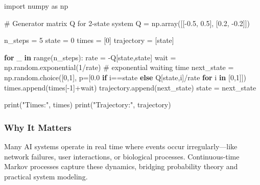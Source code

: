 \documentclass[
  letterpaper,
  DIV=11,
  numbers=noendperiod]{scrreprt}
\newenvironment{Shaded}{\begin{snugshade}}{\end{snugshade}}
\newcommand{\BuiltInTok}[1]{\textcolor[rgb]{0.00,0.23,0.31}{#1}}
\newcommand{\CommentTok}[1]{\textcolor[rgb]{0.37,0.37,0.37}{#1}}
\newcommand{\ControlFlowTok}[1]{\textcolor[rgb]{0.00,0.23,0.31}{\textbf{#1}}}
\newcommand{\DecValTok}[1]{\textcolor[rgb]{0.68,0.00,0.00}{#1}}
\newcommand{\FloatTok}[1]{\textcolor[rgb]{0.68,0.00,0.00}{#1}}
\newcommand{\ImportTok}[1]{\textcolor[rgb]{0.00,0.46,0.62}{#1}}
\newcommand{\KeywordTok}[1]{\textcolor[rgb]{0.00,0.23,0.31}{\textbf{#1}}}
\newcommand{\NormalTok}[1]{\textcolor[rgb]{0.00,0.23,0.31}{#1}}
\newcommand{\OperatorTok}[1]{\textcolor[rgb]{0.37,0.37,0.37}{#1}}
\newcommand{\StringTok}[1]{\textcolor[rgb]{0.13,0.47,0.30}{#1}}
\begin{document}
\begin{Shaded}
\begin{Highlighting}[]
\ImportTok{import}\NormalTok{ numpy }\ImportTok{as}\NormalTok{ np}

\CommentTok{\# Generator matrix Q for 2{-}state system}
\NormalTok{Q }\OperatorTok{=}\NormalTok{ np.array([[}\OperatorTok{{-}}\FloatTok{0.5}\NormalTok{, }\FloatTok{0.5}\NormalTok{],}
\NormalTok{              [}\FloatTok{0.2}\NormalTok{, }\OperatorTok{{-}}\FloatTok{0.2}\NormalTok{]])}

\NormalTok{n\_steps }\OperatorTok{=} \DecValTok{5}
\NormalTok{state }\OperatorTok{=} \DecValTok{0}
\NormalTok{times }\OperatorTok{=}\NormalTok{ [}\DecValTok{0}\NormalTok{]}
\NormalTok{trajectory }\OperatorTok{=}\NormalTok{ [state]}

\ControlFlowTok{for}\NormalTok{ \_ }\KeywordTok{in} \BuiltInTok{range}\NormalTok{(n\_steps):}
\NormalTok{    rate }\OperatorTok{=} \OperatorTok{{-}}\NormalTok{Q[state,state]}
\NormalTok{    wait }\OperatorTok{=}\NormalTok{ np.random.exponential(}\DecValTok{1}\OperatorTok{/}\NormalTok{rate)  }\CommentTok{\# exponential waiting time}
\NormalTok{    next\_state }\OperatorTok{=}\NormalTok{ np.random.choice([}\DecValTok{0}\NormalTok{,}\DecValTok{1}\NormalTok{], p}\OperatorTok{=}\NormalTok{[}\FloatTok{0.0} \ControlFlowTok{if}\NormalTok{ i}\OperatorTok{==}\NormalTok{state }\ControlFlowTok{else}\NormalTok{ Q[state,i]}\OperatorTok{/}\NormalTok{rate }\ControlFlowTok{for}\NormalTok{ i }\KeywordTok{in}\NormalTok{ [}\DecValTok{0}\NormalTok{,}\DecValTok{1}\NormalTok{]])}
\NormalTok{    times.append(times[}\OperatorTok{{-}}\DecValTok{1}\NormalTok{]}\OperatorTok{+}\NormalTok{wait)}
\NormalTok{    trajectory.append(next\_state)}
\NormalTok{    state }\OperatorTok{=}\NormalTok{ next\_state}

\BuiltInTok{print}\NormalTok{(}\StringTok{"Times:"}\NormalTok{, times)}
\BuiltInTok{print}\NormalTok{(}\StringTok{"Trajectory:"}\NormalTok{, trajectory)}
\end{Highlighting}
\end{Shaded}

\subsubsection{Why It Matters}\label{why-it-matters-91}

Many AI systems operate in real time where events occur
irregularly---like network failures, user interactions, or biological
processes. Continuous-time Markov processes capture these dynamics,
bridging probability theory and practical system modeling.
\end{document}
